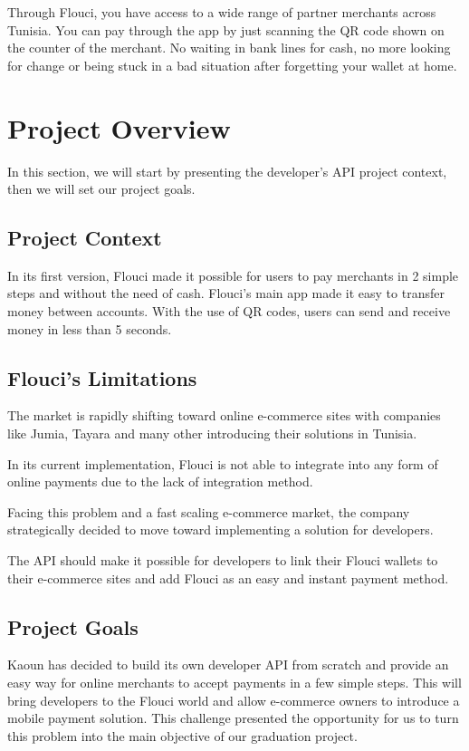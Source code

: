 \begin{spacing}{1.2}
\begin{itemize}
  Through Flouci, you have access to a wide range of partner merchants across Tunisia. You can pay through the app by just scanning the QR code shown on the counter of the merchant. No waiting in bank lines for cash, no more looking for change or being stuck in a bad situation after forgetting your wallet at home.
\end{itemize}

\section{Project Overview}
In this section, we will start by presenting the developer's API project context, then we will set our project goals.
\subsection{Project Context}
In its first version, Flouci made it possible for users to pay merchants in 2 simple steps and without the need of cash.
Flouci's main app made it easy to transfer money between accounts. With the use of QR codes, users can send and receive money in less than 5 seconds.

\subsection{Flouci's Limitations}
The market is rapidly shifting toward online e-commerce sites with companies like Jumia, Tayara and many other introducing their solutions in Tunisia.

In its current implementation, Flouci is not able to integrate into any form of online payments due to the lack of integration method.

Facing this problem and a fast scaling e-commerce market, the company strategically decided to move toward implementing a solution for developers.

The API should make it possible for developers to link their Flouci wallets to their e-commerce sites and add Flouci as an easy and instant payment method.
\subsection{Project Goals}
Kaoun has decided to build its own developer API from scratch and provide an easy way for online merchants to accept payments in a few simple steps. This will bring developers to the Flouci world and allow e-commerce owners to introduce a mobile payment solution. This challenge presented the opportunity for us to turn this problem into the main objective of our graduation project.


\end{spacing}
